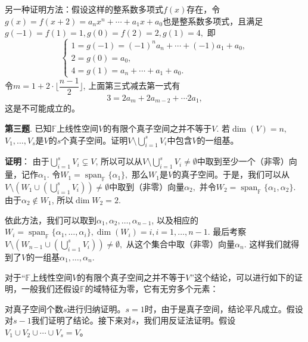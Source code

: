 \vspace{1em}

另一种证明方法：假设这样的整系数多项式$f(x)$存在，令$g(x) = f(x+2) = a_nx^n + \cdots + a_1x + a_0$也是整系数多项式，且满足$g(-1) = f(1) = 1, g(0) = f(2) = 2, g(1) = 4,$ 即
$$\begin{cases}
1 = g(-1) = (-1)^na_n + \cdots + (-1)a_1 + a_0, \\
2 = g(0) = a_0, \\
4 = g(1) = a_n + \cdots + a_1 + a_0.
\end{cases}$$
令$m = 1 + 2 \cdot \lfloor \dfrac{n-1}{2} \rfloor$, 上面第三式减去第一式有
$$3 = 2a_m + 2a_{m-2} + \cdots 2a_1,$$
这是不可能成立的。

\fi  %

\newpageorvspace

{\bf 第三题}. 已知$\mathbb{F}$上线性空间$V$的有限个真子空间之并不等于$V.$ 若$\dim(V) = n,$ $V_1, \ldots, V_s$是$V$的$s$个真子空间。证明$\displaystyle V \setminus \bigcup_{i=1}^s V_i$中包含$V$的一组基。

\ifIncludeAnswer

\newpageorvspace

{\bf 证明}： 由于$\displaystyle \bigcup_{i=1}^s V_i \subsetneq V$, 所以可以从$V \setminus \bigcup_{i=1}^s V_i \neq \emptyset$中取到至少一个（非零）向量，记作$\alpha_1.$ 令$W_1 = \operatorname{span}_{\mathbb{F}}\{\alpha_1\},$ 那么$W_1$是$V$的真子空间。于是，我们可以从$V \setminus \left( W_1 \cup \left( \bigcup_{i=1}^s V_i \right) \right) \neq \emptyset$中取到（非零）向量$\alpha_2,$ 并令$W_2 = \operatorname{span}_{\mathbb{F}}\{\alpha_1, \alpha_2\}$. 由于$\alpha_2 \not\in W_1$, 所以$\dim W_2 = 2$.

依此方法，我们可以取到$\alpha_1, \alpha_2, \ldots, \alpha_{n-1}$, 以及相应的$W_i = \operatorname{span}_{\mathbb{F}}\{\alpha_1, \ldots, \alpha_i\}, \dim (W_i) = i, i=1, \ldots, n-1$. 最后考察$V \setminus \left( W_{n-1} \cup \left( \bigcup_{i=1}^s V_i \right) \right) \neq \emptyset,$ 从这个集合中取（非零）向量$\alpha_n$. 这样我们就得到了$V$的一组基$\alpha_1, \ldots, \alpha_n.$

\vspace{1em}

对于``$\mathbb{F}$上线性空间$V$的有限个真子空间之并不等于$V$''这个结论，可以进行如下的证明，一般我们还假设$\mathbb{F}$的域特征为零，它有无穷多个元素：

对真子空间个数$s$进行归纳证明。$s=1$时，由于是真子空间，结论平凡成立。假设对$s-1$我们证明了结论。接下来对$s$，我们用反证法证明。假设$V_1\cup V_2\cup \cdots \cup V_s = V$。


